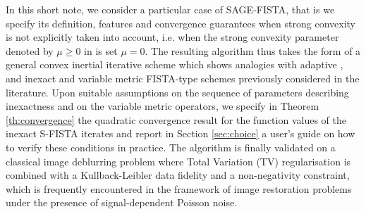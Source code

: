 \documentclass[conference]{IEEEtran}
\begin{document}
In this short note, we consider a particular case of SAGE-FISTA, that is we specify its definition, features and convergence guarantees when strong convexity is not explicitly taken into account, i.e. when the strong convexity parameter denoted by $\mu\geq 0$ in \cite{SAGE-FISTA} is set $\mu=0$. The resulting algorithm thus takes the form of a general convex inertial iterative scheme which shows analogies with adaptive \cite{Scheinberg-2014}, and inexact and variable metric \cite{Bonettini2018a} FISTA-type schemes previously considered in the literature. Upon suitable assumptions on the sequence of parameters describing inexactness and on the variable metric operators, we specify in Theorem \ref{th:convergence} the quadratic convergence result for the function values of the inexact S-FISTA iterates and report in Section \ref{sec:choice} a user's guide on how to verify these conditions in practice. The algorithm is finally validated on a classical image deblurring problem where Total Variation (TV) regularisation is combined with a Kullback-Leibler data fidelity and a non-negativity constraint, which is frequently encountered in the framework of image restoration problems under the presence of signal-dependent Poisson noise.
\end{document}
